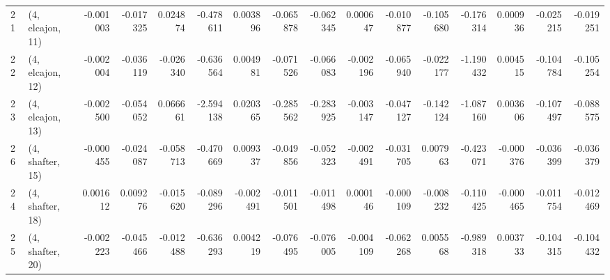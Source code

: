 \begin{tabular}{llrrrrrrrrrrrrrr}
21 &  (4, elcajon, 11) &  -0.001003 & -0.017325 &  0.024874 &  -0.478611 &  0.003896 &  -0.065878 & -0.062345 &  0.000647 & -0.010877 & -0.105680 &  -0.176314 &  0.000936 & -0.025215 & -0.019251 \\
22 &  (4, elcajon, 12) &  -0.002004 & -0.036119 & -0.026340 &  -0.636564 &  0.004981 &  -0.071526 & -0.066083 & -0.002196 & -0.065940 & -0.022177 &  -1.190432 &  0.004515 & -0.104784 & -0.105254 \\
23 &  (4, elcajon, 13) &  -0.002500 & -0.054052 &  0.066661 &  -2.594138 &  0.020365 &  -0.285562 & -0.283925 & -0.003147 & -0.047127 & -0.142124 &  -1.087160 &  0.003606 & -0.107497 & -0.088575 \\
26 &  (4, shafter, 15) &  -0.000455 & -0.024087 & -0.058713 &  -0.470669 &  0.009337 &  -0.049856 & -0.052323 & -0.002491 & -0.031705 &  0.007963 &  -0.423071 & -0.000376 & -0.036399 & -0.036379 \\
24 &  (4, shafter, 18) &   0.001612 &  0.009276 & -0.015620 &  -0.089296 & -0.002491 &  -0.011501 & -0.011498 &  0.000146 & -0.000109 & -0.008232 &  -0.110425 & -0.000465 & -0.011754 & -0.012469 \\
25 &  (4, shafter, 20) &  -0.002223 & -0.045466 & -0.012488 &  -0.636293 &  0.004219 &  -0.076495 & -0.076005 & -0.004109 & -0.062268 &  0.005568 &  -0.989318 &  0.003733 & -0.104315 & -0.104432 \\
\bottomrule
\end{tabular}
